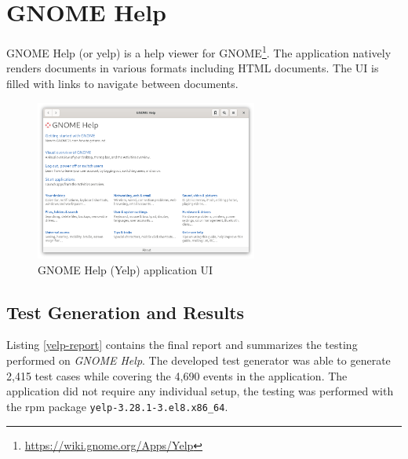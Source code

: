 


\section{GNOME Help}\label{}
GNOME Help (or yelp) is a help viewer for GNOME\footnote{\url{https://wiki.gnome.org/Apps/Yelp}}. The application natively renders documents in various formats including HTML documents. The UI is filled with links to navigate between documents.

\begin{figure}[H]
	\centering
	\includegraphics[width=0.65\textwidth,clip]{obrazky-figures/yelp-ui.png}
	\caption{GNOME Help (Yelp) application UI}
	\label{yelp_ui}
\end{figure}

\subsection*{Test Generation and Results}\label{firefox_bug}
Listing \ref{yelp-report} contains the final report and summarizes the testing performed on \textit{GNOME Help}. The developed test generator was able to generate 2,415 test cases while covering the 4,690 events in the application. The application did not require any individual setup, the testing was performed with the rpm package \texttt{yelp-3.28.1-3.el8.x86\_64}.

